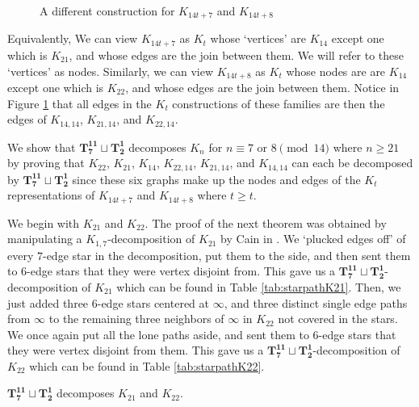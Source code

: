 \begin{figure}[H]
\begin{center}
    \end{center}
    \caption{A different construction for $K_{14t+7}$ and $K_{14t+8}$}
    \label{fig:newconstrK21K22}
  \end{figure}
Equivalently, We can view $K_{14t+7}$ as $K_{t}$ whose `vertices' are $K_{14}$ except one which is $K_{21}$, and whose edges are the join between them. We will refer to these `vertices' as nodes. Similarly, we can view $K_{14t+8}$ as $K_{t}$ whose nodes are are $K_{14}$ except one which is $K_{22}$, and whose edges are the join between them. Notice in Figure \ref{fig:newconstrK21K22} that all edges in the $K_{t}$ constructions of these families are then the edges of $K_{14,14}$, $K_{21,14}$, and $K_{22,14}$.

We show that $\mathbf{T_{7}^{11}}\sqcup\mathbf{T_{2}^{1}}$ decomposes $K_{n}$ for $n\equiv7 \textrm{ or }8\pmod{14}$ where $n\geq 21$ by proving that $K_{22}$, $K_{21}$, $K_{14}$, $K_{22,14}$, $K_{21,14}$, and $K_{14,14}$ can each be decomposed by $\mathbf{T_{7}^{11}}\sqcup\mathbf{T_{2}^{1}}$ since these six graphs make up the nodes and edges of the $K_{t}$ representations of $K_{14t+7}$ and $K_{14t+8}$ where $t\geq t$.

We begin with $K_{21}$ and $K_{22}$. The proof of the next theorem was obtained by manipulating a $K_{1,7}$-decomposition of $K_{21}$ by Cain in \cite{Cain1974}. We `plucked edges off' of every $7$-edge star in the decomposition, put them to the side, and then sent them to $6$-edge stars that they were vertex disjoint from. This gave us a $\mathbf{T_{7}^{11}}\sqcup\mathbf{T_{2}^{1}}$-decomposition of $K_{21}$ which can be found in Table \ref{tab:starpathK21}. Then, we just added three $6$-edge stars centered at $\infty$, and three distinct single edge paths from $\infty$ to the remaining three neighbors of $\infty$ in $K_{22}$ not covered in the stars. We once again put all the lone paths aside, and sent them to $6$-edge stars that they were vertex disjoint from them. This gave us a $\mathbf{T_{7}^{11}}\sqcup\mathbf{T_{2}^{1}}$-decomposition of $K_{22}$ which can be found in Table \ref{tab:starpathK22}.
\begin{thm}\label{thm:PCstarpath}
    $\mathbf{T_{7}^{11}}\sqcup\mathbf{T_{2}^{1}}$ decomposes $K_{21}$ and $K_{22}$.
\end{thm}

